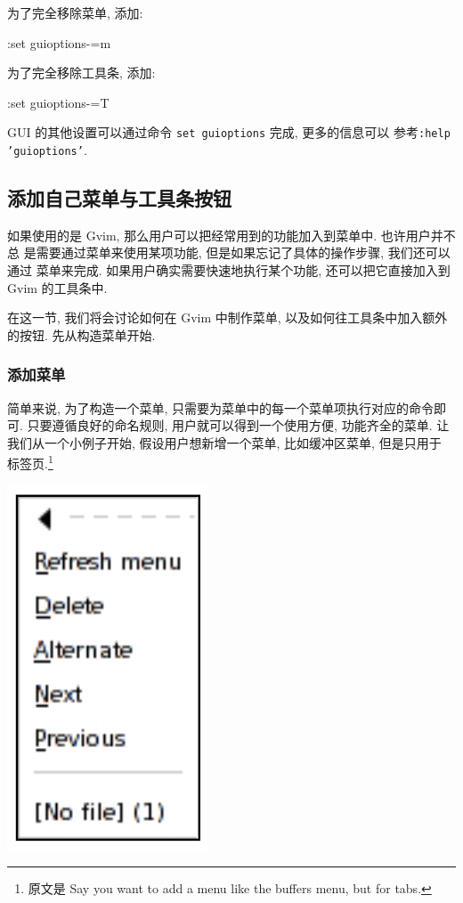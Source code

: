 为了完全移除菜单, 添加:
\begin{vimcmd}
:set guioptions-=m
\end{vimcmd}

为了完全移除工具条, 添加:
\begin{vimcmd}
:set guioptions-=T
\end{vimcmd}

\begin{warning}
    GUI 的其他设置可以通过命令 \texttt{set guioptions} 完成, 更多的信息可以
    参考\texttt{:help 'guioptions'}.
\end{warning}

\subsection{添加自己菜单与工具条按钮}
\label{subsec:adding_your_own_menu_and_toolbar_buttons}
如果使用的是 Gvim, 那么用户可以把经常用到的功能加入到菜单中. 也许用户并不总
是需要通过菜单来使用某项功能, 但是如果忘记了具体的操作步骤, 我们还可以通过
菜单来完成. 如果用户确实需要快速地执行某个功能, 还可以把它直接加入到 Gvim
的工具条中.

在这一节, 我们将会讨论如何在 Gvim 中制作菜单, 以及如何往工具条中加入额外
的按钮. 先从构造菜单开始.

\subsubsection{添加菜单}
\label{subsubsec:adding_a_menu}
简单来说, 为了构造一个菜单, 只需要为菜单中的每一个菜单项执行对应的命令即可.
只要遵循良好的命名规则, 用户就可以得到一个使用方便, 功能齐全的菜单.
让我们从一个小例子开始, 假设用户想新增一个菜单, 比如缓冲区菜单, 但是只用于
标签页.\footnote{ 原文是 Say you want to add a menu like the buffers menu,
but for tabs.}

\begin{center}
\includegraphics[scale=0.42]{./images/page30.png}
\end{center}

